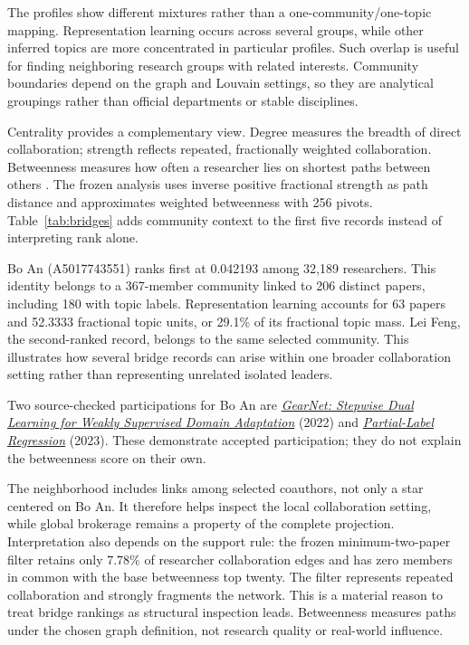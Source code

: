 The profiles show different mixtures rather than a one-community/one-topic
mapping. Representation learning occurs across several groups, while other
inferred topics are more concentrated in particular profiles. Such overlap is
useful for finding neighboring research groups with related interests.
Community boundaries depend on the graph and Louvain settings, so they are
analytical groupings rather than official departments or stable disciplines.

Centrality provides a complementary view. Degree measures the breadth of direct
collaboration; strength reflects repeated, fractionally weighted collaboration.
Betweenness measures how often a researcher lies on shortest paths between
others \citep{freeman1977betweenness}. The frozen analysis uses inverse positive
fractional strength as path distance and approximates weighted betweenness with
256 pivots. Table~\ref{tab:bridges} adds community context to the first five
records instead of interpreting rank alone.



Bo An (A5017743551) ranks first at 0.042193 among 32,189 researchers. This
identity belongs to a 367-member community linked to 206 distinct papers,
including 180 with topic labels. Representation learning accounts for 63 papers
and 52.3333 fractional topic units, or 29.1\% of its fractional topic mass.
Lei Feng, the second-ranked record, belongs to the same selected community.
This illustrates how several bridge records can arise within one broader
collaboration setting rather than representing unrelated isolated leaders.

Two source-checked participations for Bo An are
\href{https://doi.org/10.1609/aaai.v36i8.20851}{\emph{GearNet: Stepwise Dual
Learning for Weakly Supervised Domain Adaptation}} (2022) and
\href{https://doi.org/10.1609/aaai.v37i6.25871}{\emph{Partial-Label Regression}}
(2023). These demonstrate accepted participation; they do not explain the
betweenness score on their own.

\FloatBarrier

The neighborhood includes links among selected coauthors, not only a star
centered on Bo An. It therefore helps inspect the local collaboration setting,
while global brokerage remains a property of the complete projection.
Interpretation also depends on the support rule: the frozen minimum-two-paper
filter retains only 7.78\% of researcher collaboration edges and has zero
members in common with the base betweenness top twenty. The filter represents
repeated collaboration and strongly fragments the network. This is a material
reason to treat bridge rankings as structural inspection leads. Betweenness
measures paths under the chosen graph definition, not research quality or
real-world influence.

